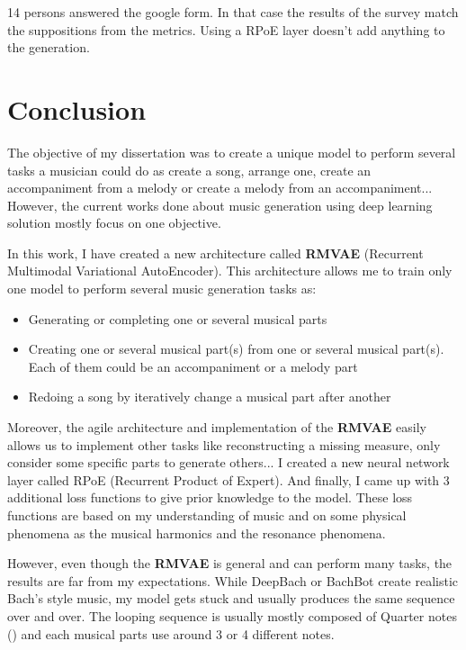 \documentclass[12pt]{report}
\begin{document}
14 persons answered the google form.
In that case the results of the survey match the suppositions from the metrics.
Using a RPoE layer doesn't add anything to the generation.




\chapter{Conclusion}

The objective of my dissertation was to create a unique model to perform several tasks a musician could do as create a song, arrange one, create an accompaniment from a melody or create a melody from an accompaniment... 
However, the current works done about music generation using deep learning solution mostly focus on one objective.

In this work, I have created a new architecture called \textbf{RMVAE} (Recurrent Multimodal Variational AutoEncoder).
This architecture allows me to train only one model to perform several music generation tasks as:
\begin{itemize}
    \item Generating or completing one or several musical parts
    \item Creating one or several musical part(s) from one or several musical part(s).
    Each of them could be an accompaniment or a melody part
    \item Redoing a song by iteratively change a musical part after another
\end{itemize}
Moreover, the agile architecture and implementation of the \textbf{RMVAE} easily allows us to implement other tasks like reconstructing a missing measure, only consider some specific parts to generate others...
I created a new neural network layer called RPoE (Recurrent Product of Expert).
And finally, I came up with 3 additional loss functions to give prior knowledge to the model.
These loss functions are based on my understanding of music and on some physical phenomena as the musical harmonics and the resonance phenomena.

However, even though the \textbf{RMVAE} is general and can perform many tasks, the results are far from my expectations.
While DeepBach \cite{hadjeres_deepbach:_2016} or BachBot \cite{liang_automatic_2017} create realistic Bach's style music, my model gets stuck and usually produces the same sequence over and over.
The looping sequence is usually mostly composed of Quarter notes (\musQuarter) and each musical parts use around 3 or 4 different notes.
\end{document}
